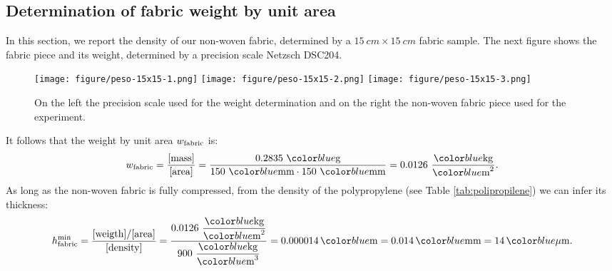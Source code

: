 
\subsection{Determination of fabric weight by unit area}
\label{subsec:weight}
In this section, we report the density of our non-woven fabric, determined by a $15\ \unit{cm} \times 15\ \unit{cm}$ fabric sample. The next figure shows the fabric piece and its weight, determined by a precision scale Netzsch DSC204.
\begin{figure}[H]
  \begin{center}
    \texttt{[image: figure/peso-15x15-1.png]}
    \texttt{[image: figure/peso-15x15-2.png]}
    \texttt{[image: figure/peso-15x15-3.png]}
  \end{center}
  \caption{On the left the precision scale used for the weight determination and on the right the non-woven fabric piece used for the experiment.}
  \label{fig:weight}
\end{figure}
It follows that the weight by unit area $w_{\mathrm{fabric}}$ is:
\begin{equation}\label{eq:wT}
   \wtissue=\dfrac{[\textrm{mass}]}{[\textrm{area}]}=
   \dfrac{0.2835 \ \unit{g}}{150 \ \unit{mm}\cdot 150 \ \unit{mm}} = 0.0126 \ 
   \dfrac{\unit{kg}}{\unit{m}^2}.
\end{equation}
As long as the non-woven fabric is fully compressed, from the density of the polypropylene (see Table \ref{tab:polipropilene}) we can infer its thickness:
\[
   \htissuemin = \dfrac{[\textrm{weigth}]/[\textrm{area}]}{[\textrm{density}]}
     = \dfrac{0.0126 \ \dfrac{\unit{kg}}{\unit{m}^2}}
             {900 \ \dfrac{\unit{kg}}{\unit{m}^3}}
     = 0.000014\,\unit{m}
     = 0.014\,\unit{mm}
     = 14\,\unit{$\mu$m}.
\]
